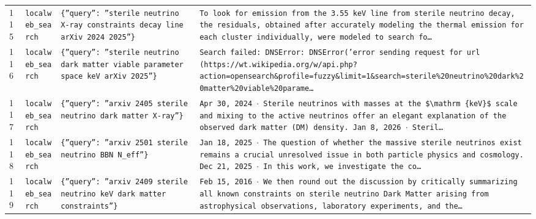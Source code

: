 \documentclass[11pt,a4paper]{article}
\begin{document}
\begin{longtable}{@{}p{}p{}p{}p{}@{}}
115 & \texttt{local}\newline\texttt{web\_\allowbreak{}search} & \texttt{\{''query'':\allowbreak{} ''sterile neutrino X-ray constraints decay line arXiv 2024 2025''\}\allowbreak{}} & \texttt{To look for emission from the 3.55 keV line from sterile neutrino decay,\allowbreak{} the residuals,\allowbreak{} obtained after accurately modeling the thermal emission for each cluster individually,\allowbreak{} were modeled to search fo\ldots{}\allowbreak{}} \\
116 & \texttt{local}\newline\texttt{web\_\allowbreak{}search} & \texttt{\{''query'':\allowbreak{} ''sterile neutrino dark matter viable parameter space keV arXiv 2025''\}\allowbreak{}} & \texttt{Search failed:\allowbreak{} DNSError:\allowbreak{} DNSError('error sending request for url (https:\allowbreak{}/\allowbreak{}/\allowbreak{}wt.wikipedia.org/\allowbreak{}w/\allowbreak{}api.php?action=\allowbreak{}opensearch\&profile=\allowbreak{}fuzzy\&limit=\allowbreak{}1\&search=\allowbreak{}sterile\%20neutrino\%20dark\%20matter\%20viable\%20parame\ldots{}\allowbreak{}} \\
117 & \texttt{local}\newline\texttt{web\_\allowbreak{}search} & \texttt{\{''query'':\allowbreak{} ''arxiv 2405 sterile neutrino dark matter X-ray''\}\allowbreak{}} & \texttt{Apr 30,\allowbreak{} 2024 $\cdot$ Sterile neutrinos with masses at the \$\textbackslash{}\allowbreak{}mathrm \{keV\}\allowbreak{}\$ scale and mixing to the active neutrinos offer an elegant explanation of the observed dark matter (DM)\allowbreak{} density. Jan 8,\allowbreak{} 2026 $\cdot$ Steril\ldots{}\allowbreak{}} \\
118 & \texttt{local}\newline\texttt{web\_\allowbreak{}search} & \texttt{\{''query'':\allowbreak{} ''arxiv 2501 sterile neutrino BBN N\_\allowbreak{}eff''\}\allowbreak{}} & \texttt{Jan 18,\allowbreak{} 2025 $\cdot$ The question of whether the massive sterile neutrinos exist remains a crucial unresolved issue in both particle physics and cosmology. Dec 21,\allowbreak{} 2025 $\cdot$ In this work,\allowbreak{} we investigate the co\ldots{}\allowbreak{}} \\
119 & \texttt{local}\newline\texttt{web\_\allowbreak{}search} & \texttt{\{''query'':\allowbreak{} ''arxiv 2409 sterile neutrino keV dark matter constraints''\}\allowbreak{}} & \texttt{Feb 15,\allowbreak{} 2016 $\cdot$ We then round out the discussion by critically summarizing all known constraints on sterile neutrino Dark Matter arising from astrophysical observations,\allowbreak{} laboratory experiments,\allowbreak{} and the\ldots{}\allowbreak{}} \\

\end{longtable}
\end{document}
